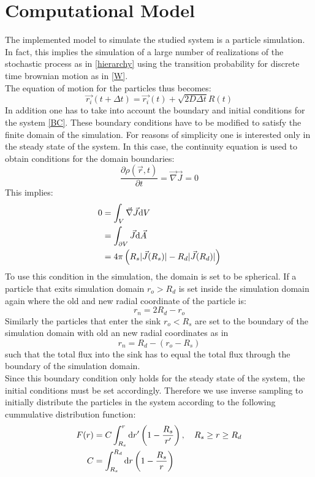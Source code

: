 \section{Computational Model}

The implemented model to simulate the studied system is a particle simulation. In fact, this implies the simulation of a large number of realizations of the stochastic process as in \eqref{hierarchy} using the transition probability for discrete time brownian motion as in \eqref{W}.\\
The equation of motion for the particles thus becomes:
\begin{equation}
    \vec{r_i}(t + \Delta t) = \vec{r_i}(t) + \sqrt{2 D \Delta t}R(t)
    \label{computational eqm}
\end{equation}
In addition one has to take into account the boundary and initial conditions for the system \eqref{BC}. These boundary conditions have to be modified to satisfy the finite domain of the simulation.
For reasons of simplicity one is interested only in the steady state of the system.
In this case, the continuity equation is used to obtain conditions for the domain boundaries:
\begin{equation}
    \frac{\partial \rho(\vec{r},t)}{\partial t} = \vec{\nabla} \vec{J} = 0
\end{equation}
This implies:
\begin{align}
    0   &= \int_V \vec{\nabla}\vec{J} {\rm d} V \nonumber \\
    &= \int_{\partial V} \vec{J} {\rm d} \vec{A} \nonumber \\
    &= 4 \pi \left( R_s |\vec{J}(R_s)| - R_d |\vec{J}(R_d)| \right)
\end{align}
To use this condition in the simulation, the domain is set to be spherical. If a particle that exits simulation domain $r_o > R_d$ is set inside the simulation domain again where the old and new radial coordinate of the particle is:
\begin{equation}
    r_n = 2 R_d - r_o
\end{equation}
Similarly the particles that enter the sink $r_o < R_s$ are set to the boundary of the simulation domain with old an new radial coordinates as in 
\begin{equation}
    r_n = R_d - (r_o - R_s)
\end{equation}
such that the total flux into the sink has to equal the total flux through the boundary of the simulation domain. \\
Since this boundary condition only holds for the steady state of the system, the initial conditions must be set accordingly. Therefore we use inverse sampling to initially distribute the particles in the system according to the following cummulative distribution function:
\begin{align}
    F(r) &= C \int_{R_s}^{r} {\rm d} r' \left( 1 - \frac{R_s}{r'} \right), \quad R_s \ge r \ge R_d \\
    C    &= \int_{R_s}^{R_d} {\rm d} r \left( 1 - \frac{R_s}{r} \right)
    \label{CDF}
\end{align}

